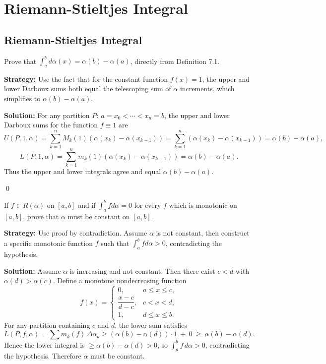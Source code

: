 \chapter{Riemann-Stieltjes Integral}

\section{Riemann-Stieltjes Integral}


\begin{problembox}
\begin{problemstatement}
Prove that $\int_a^b d\alpha(x) = \alpha(b) - \alpha(a)$, directly from Definition 7.1.
\end{problemstatement}
\end{problembox}

\noindent\textbf{Strategy:} Use the fact that for the constant function $f(x) = 1$, the upper and lower Darboux sums both equal the telescoping sum of $\alpha$ increments, which simplifies to $\alpha(b) - \alpha(a)$.

\bigskip\noindent\textbf{Solution:}
For any partition $P:\ a=x_0<\cdots<x_n=b$, the upper and lower Darboux sums for the function $f\equiv 1$ are
\[U(P,1,\alpha)=\sum_{k=1}^n M_k(1)(\alpha(x_k)-\alpha(x_{k-1}))=\sum_{k=1}^n (\alpha(x_k)-\alpha(x_{k-1}))=\alpha(b)-\alpha(a),\]
\[L(P,1,\alpha)=\sum_{k=1}^n m_k(1)(\alpha(x_k)-\alpha(x_{k-1}))=\alpha(b)-\alpha(a).\]
Thus the upper and lower integrals agree and equal $\alpha(b)-\alpha(a)$.




\qed
\begin{problembox}
\begin{problemstatement}
If $f \in R(\alpha)$ on $[a, b]$ and if $\int_a^b f d\alpha = 0$ for every $f$ which is monotonic on $[a, b]$, prove that $\alpha$ must be constant on $[a, b]$.
\end{problemstatement}
\end{problembox}

\noindent\textbf{Strategy:} Use proof by contradiction. Assume $\alpha$ is not constant, then construct a specific monotonic function $f$ such that $\int_a^b f d\alpha > 0$, contradicting the hypothesis.

\bigskip\noindent\textbf{Solution:}
Assume $\alpha$ is increasing and not constant. Then there exist $c<d$ with $\alpha(d)>\alpha(c)$. Define a monotone nondecreasing function
\[
f(x)=\begin{cases}
0,& a\le x\le c,\\
\dfrac{x-c}{d-c},& c<x<d,\\
1,& d\le x\le b.
\end{cases}
\]
For any partition containing $c$ and $d$, the lower sum satisfies
\[L(P,f,\alpha)=\sum m_k(f)\,\Delta\alpha_k\ge (\alpha(b)-\alpha(d))\cdot 1\ +\ 0\ \ge\ \alpha(b)-\alpha(d).
\]
Hence the lower integral is $\ge \alpha(b)-\alpha(d)>0$, so $\int_a^b f\,d\alpha>0$, contradicting the hypothesis. Therefore $\alpha$ must be constant.





